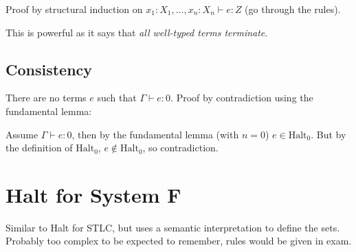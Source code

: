 \documentclass[a4paper,11pt]{article}
\begin{document}
{{        Proof by structural induction on \(x_1:X_1,...,x_n:X_n \vdash e : Z\) (go through the rules).

        This is powerful as it says that \textit{all well-typed terms terminate}.

    }
    \subsection*{Consistency}
    {
        There are no terms \(e\) such that \(\Gamma\vdash e : 0\). Proof by contradiction using the fundamental lemma:

        Assume \(\Gamma\vdash e : 0\), then by the fundamental lemma (with \(n=0\)) \(e \in \text{Halt}_0\). But by the
        definition of \(\text{Halt}_0\), \(e\notin\text{Halt}_0\), so contradiction.

    }
}
\section{Halt for System F}
{

    Similar to Halt for STLC, but uses a semantic interpretation to define the sets. Probably too complex to be expected
    to remember, rules would be given in exam.

}
\end{document}
